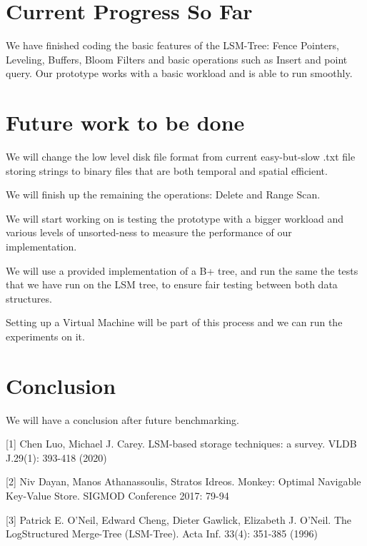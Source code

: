 \documentclass[sigconf]{acmart}
\begin{document}
    \section{Current Progress So Far}

    We have finished coding the basic features of the LSM-Tree: Fence Pointers, Leveling, Buffers, Bloom Filters and basic operations such as Insert and point query. Our prototype works with a basic workload and is able to run smoothly.

    \section{Future work to be done}

    We will change the low level disk file format from current easy-but-slow .txt file storing strings to binary files that are both temporal and spatial efficient.

    We will finish up the remaining the operations: Delete and Range Scan.

    We will start working on is testing the prototype with a bigger workload and various levels of unsorted-ness to measure the performance of our implementation.


    We will use a provided implementation of a B+ tree, and run the same the tests that we have run on the LSM tree, to ensure fair testing between both data structures.

    Setting up a Virtual Machine will be part of this process and we can run the experiments on it.

    \section{Conclusion}

    We will have a conclusion after future benchmarking.

        {
        
        

        [1] Chen Luo, Michael J. Carey. LSM-based storage techniques: a survey. VLDB J.29(1): 393-418 (2020)

        [2] Niv Dayan, Manos Athanassoulis, Stratos Idreos. Monkey: Optimal Navigable
        Key-Value Store. SIGMOD Conference 2017: 79-94

        [3] Patrick E. O'Neil, Edward Cheng, Dieter Gawlick, Elizabeth J. O'Neil. The LogStructured Merge-Tree (LSM-Tree). Acta Inf. 33(4): 351-385 (1996)
    }
\end{document}
